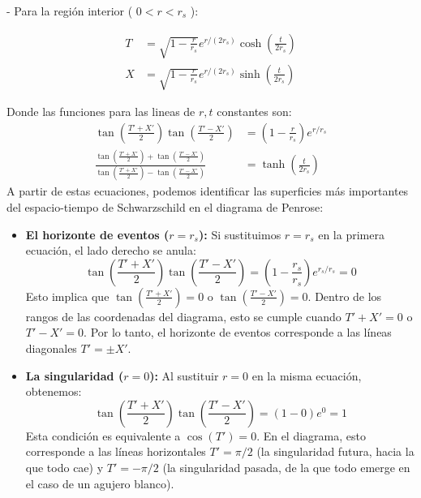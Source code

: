 - Para la región interior ( $0<r<r_s$ ):

$$
  \begin{aligned}
    T & =\sqrt{1-\frac{r}{r_s}} e^{r /\left(2 r_s\right)} \cosh \left(\frac{t}{2 r_s}\right) \\
    X & =\sqrt{1-\frac{r}{r_s}} e^{r /\left(2 r_s\right)} \sinh \left(\frac{t}{2 r_s}\right)
  \end{aligned}
$$



Donde las funciones para las lineas de $r, t$ constantes son:
\begin{equation}
  \begin{aligned}
    \tan\left(\frac{T'+X'}{2}\right) \tan\left(\frac{T'-X'}{2}\right)                                                                               & = \left(1-\frac{r}{r_s}\right)e^{r/r_s} \\
    \frac{\tan\left(\frac{T'+X'}{2}\right) + \tan\left(\frac{T'-X'}{2}\right)}{\tan\left(\frac{T'+X'}{2}\right) - \tan\left(\frac{T'-X'}{2}\right)} & = \tanh\left(\frac{t}{2r_s}\right)
  \end{aligned}
\end{equation}
A partir de estas ecuaciones, podemos identificar las superficies más importantes del espacio-tiempo de Schwarzschild en el diagrama de Penrose:

\begin{itemize}
  \item \textbf{El horizonte de eventos ($r=r_s$):} Si sustituimos $r=r_s$ en la primera ecuación, el lado derecho se anula:
        \begin{equation}
          \tan\left(\frac{T'+X'}{2}\right) \tan\left(\frac{T'-X'}{2}\right) = \left(1-\frac{r_s}{r_s}\right)e^{r_s/r_s} = 0
        \end{equation}
        Esto implica que $\tan\left(\frac{T'+X'}{2}\right)=0$ o $\tan\left(\frac{T'-X'}{2}\right)=0$. Dentro de los rangos de las coordenadas del diagrama, esto se cumple cuando $T'+X'=0$ o $T'-X'=0$. Por lo tanto, el horizonte de eventos corresponde a las líneas diagonales $T' = \pm X'$.

  \item \textbf{La singularidad ($r=0$):} Al sustituir $r=0$ en la misma ecuación, obtenemos:
        \begin{equation}
          \tan\left(\frac{T'+X'}{2}\right) \tan\left(\frac{T'-X'}{2}\right) = (1-0)e^0 = 1
        \end{equation}
        Esta condición es equivalente a $\cos(T')=0$. En el diagrama, esto corresponde a las líneas horizontales $T' = \pi/2$ (la singularidad futura, hacia la que todo cae) y $T' = -\pi/2$ (la singularidad pasada, de la que todo emerge en el caso de un agujero blanco).
\end{itemize}

